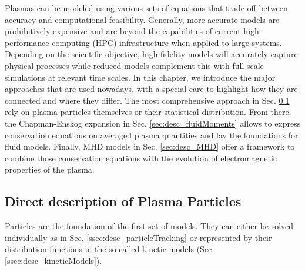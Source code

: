 Plasmas can be modeled using various sets of equations that trade off between accuracy and computational feasibility. Generally, more accurate models are prohibitively expensive and are beyond the capabilities of current high-performance computing (HPC) infrastructure when applied to large systems. Depending on the scientific objective, high-fidelity models will accurately capture physical processes while reduced models complement this with full-scale simulations at relevant time scales. In this chapter, we introduce the major approaches that are used nowadays, with a special care to highlight how they are connected and where they differ. The most comprehensive approach in Sec. \ref{sec:desc_directDesciption} rely on plasma particles themselves or their statistical distribution. From there, the Chapman-Enskog expansion in Sec. \ref{sec:desc_fluidMoments} allows to express conservation equations on averaged plasma quantities and lay the foundations for fluid models. Finally, MHD models in Sec. \ref{sec:desc_MHD} offer a framework to combine those conservation equations with the evolution of electromagnetic properties of the plasma. 

\subsection{Direct description of Plasma Particles}
\label{sec:desc_directDesciption}
Particles are the foundation of the first set of models. They can either be solved individually as in Sec. \ref{ssec:desc_particleTracking} or represented by their distribution functions in the so-called kinetic models (Sec. \ref{ssec:desc_kineticModels}).


